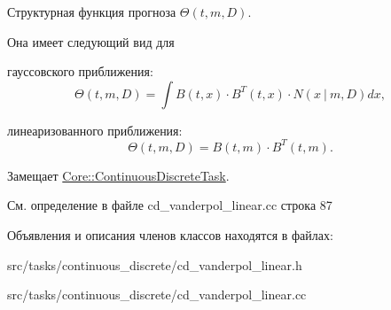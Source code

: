 Структурная функция прогноза $\Theta(t,m,D)$. 

Она имеет следующий вид для


\begin{DoxyItemize}
\item гауссовского приближения\+: \[\Theta(t,m,D) = \int B(t,x)\cdot B^T(t,x)\cdot N(x\ |\ m,D)dx,\]
\item линеаризованного приближения\+: \[\Theta(t,m,D) = B(t,m)\cdot B^T(t,m).\] 
\end{DoxyItemize}

Замещает \hyperlink{class_core_1_1_continuous_discrete_task_a961cc49fd0c72ba0a211bb4913ca3ece}{Core\+::\+Continuous\+Discrete\+Task}.



См. определение в файле cd\+\_\+vanderpol\+\_\+linear.\+cc строка 87



Объявления и описания членов классов находятся в файлах\+:\begin{DoxyCompactItemize}
\item 
src/tasks/continuous\+\_\+discrete/cd\+\_\+vanderpol\+\_\+linear.\+h\item 
src/tasks/continuous\+\_\+discrete/cd\+\_\+vanderpol\+\_\+linear.\+cc\end{DoxyCompactItemize}

